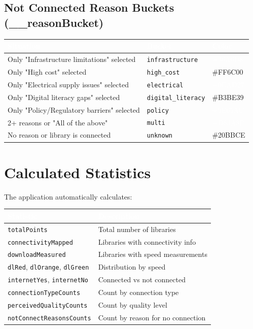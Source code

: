 \documentclass[11pt,a4paper]{article}
\begin{document}
\subsection{Not Connected Reason Buckets (\_\_reasonBucket)}

\begin{longtable}{|p{6cm}|p{3cm}|p{3cm}|}
\hline
\rowcolor{headerblue}\textcolor{white}{\textbf{Situation}} & \textcolor{white}{\textbf{Bucket}} & \textcolor{white}{\textbf{Color}} \\
\hline
Only "Infrastructure limitations" selected & \texttt{infrastructure} & \cellcolor{infra-blue}\textcolor{white}{\#36A6D8} \\
\hline
Only "High cost" selected & \texttt{high\_cost} & \cellcolor{cost-orange}\#FF6C00 \\
\hline
Only "Electrical supply issues" selected & \texttt{electrical} & \cellcolor{electrical-green}\textcolor{white}{\#0EAD27} \\
\hline
Only "Digital literacy gaps" selected & \texttt{digital\_literacy} & \cellcolor{literacy-olive}\#B3BE39 \\
\hline
Only "Policy/Regulatory barriers" selected & \texttt{policy} & \cellcolor{policy-purple}\textcolor{white}{\#9E65AC} \\
\hline
2+ reasons or "All of the above" & \texttt{multi} & \cellcolor{multi-pink}\textcolor{white}{\#D83A8F} \\
\hline
No reason or library is connected & \texttt{unknown} & \cellcolor{cyan-bucket}\#20BBCE \\
\hline
\end{longtable}

\section{Calculated Statistics}

The application automatically calculates:

\begin{longtable}{|p{5cm}|p{9cm}|}
\hline
\rowcolor{headerblue}\textcolor{white}{\textbf{Statistic}} & \textcolor{white}{\textbf{Description}} \\
\hline
\texttt{totalPoints} & Total number of libraries \\
\hline
\texttt{connectivityMapped} & Libraries with connectivity info \\
\hline
\texttt{downloadMeasured} & Libraries with speed measurements \\
\hline
\texttt{dlRed}, \texttt{dlOrange}, \texttt{dlGreen} & Distribution by speed \\
\hline
\texttt{internetYes}, \texttt{internetNo} & Connected vs not connected \\
\hline
\texttt{connectionTypeCounts} & Count by connection type \\
\hline
\texttt{perceivedQualityCounts} & Count by quality level \\
\hline
\texttt{notConnectReasonsCounts} & Count by reason for no connection \\
\hline
\end{longtable}
\end{document}
